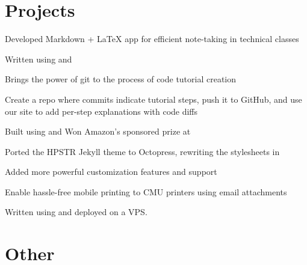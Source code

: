 \documentclass[]{deedy-resume-openfont}
\begin{document}
\begin{minipage}[t]{0.66\textwidth}
\section{Projects}
\descript{}
\begin{tightemize}
\item Developed Markdown + \LaTeX{} app for efficient note-taking in technical classes
\item Written using  and 
\end{tightemize}
\sectionsep

\descript{}
\begin{tightemize}
\item Brings the power of git to the process of code tutorial creation
\item Create a repo where commits indicate tutorial steps, push it to GitHub, and use our site to add per-step explanations with code diffs
\item Built using  and  Won Amazon's sponsored prize at 
\end{tightemize}
\sectionsep

\descript{}
\begin{tightemize}
\item Ported the HPSTR Jekyll theme to Octopress, rewriting the stylesheets in 
\item Added more powerful customization features and  support
\end{tightemize}
\sectionsep

\descript{}
\begin{tightemize}
\item Enable hassle-free mobile printing to CMU printers using email attachments
\item Written using  and  deployed on a  VPS.
\end{tightemize}
\sectionsep



\section{Other} 


\end{minipage}
\end{document}
